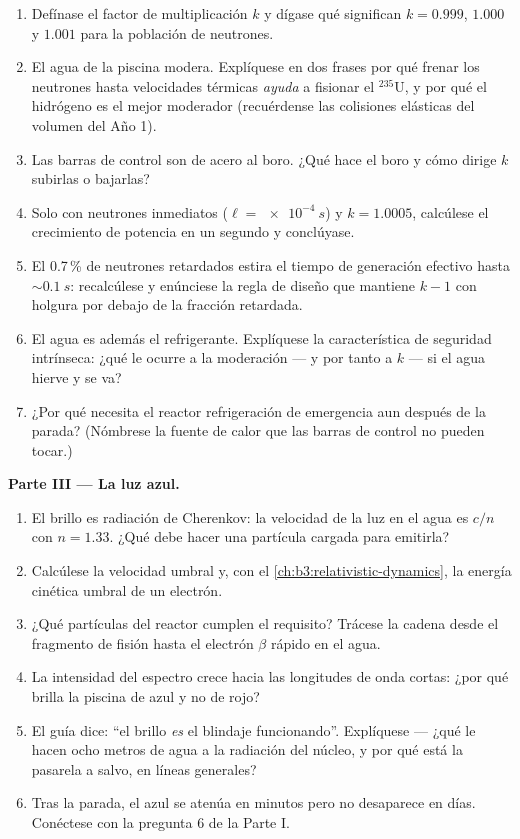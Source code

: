 \begin{problem}
\begin{enumerate}[resume]
  \item Defínase el factor de multiplicación $k$ y dígase qué significan
        $k = 0.999$, $1.000$ y $1.001$ para la población de
        neutrones.
  \item El agua de la piscina modera. Explíquese en dos frases por qué
        frenar los neutrones hasta velocidades térmicas \emph{ayuda} a fisionar
        el $^{235}$U, y por qué el hidrógeno es el mejor moderador
        (recuérdense las colisiones elásticas del volumen del Año 1).
  \item Las barras de control son de acero al boro. ¿Qué hace el boro y
        cómo dirige $k$ subirlas o bajarlas?
  \item Solo con neutrones inmediatos ($\ell = \qty{e-4}{s}$) y
        $k = 1.0005$, calcúlese el crecimiento de potencia en un segundo
        y conclúyase.
  \item El 0.7\,\% de neutrones retardados estira el tiempo de generación
        efectivo hasta $\sim\qty{0.1}{s}$: recalcúlese y
        enúnciese la regla de diseño que mantiene $k - 1$ con holgura por debajo
        de la fracción retardada.
  \item El agua es además el refrigerante. Explíquese la característica
        de seguridad intrínseca: ¿qué le ocurre a la moderación --- y por tanto
        a $k$ --- si el agua hierve y se va?
  \item ¿Por qué necesita el reactor refrigeración de emergencia aun después de la
        parada? (Nómbrese la fuente de calor que las barras de control no pueden
        tocar.)
\end{enumerate}

\medskip\noindent\textbf{Parte III --- La luz azul.}

\begin{enumerate}[resume]
  \item El brillo es radiación de Cherenkov: la velocidad de la luz en el agua
        es $c/n$ con $n = 1.33$. ¿Qué debe hacer una partícula cargada
        para emitirla?
  \item Calcúlese la velocidad umbral y, con el
        \cref{ch:b3:relativistic-dynamics}, la energía cinética umbral
        de un electrón.
  \item ¿Qué partículas del reactor cumplen el requisito? Trácese la cadena desde el
        fragmento de fisión hasta el electrón $\beta$ rápido en el agua.
  \item La intensidad del espectro crece hacia las longitudes de onda cortas:
        ¿por qué brilla la piscina de azul y no de rojo?
  \item El guía dice: ``el brillo \emph{es} el blindaje
        funcionando''. Explíquese --- ¿qué le hacen ocho metros de agua
        a la radiación del núcleo, y por qué está la pasarela a salvo, en líneas generales?
  \item Tras la parada, el azul se atenúa en minutos pero no
        desaparece en días. Conéctese con la pregunta 6 de la Parte I.
\end{enumerate}


\end{problem}
